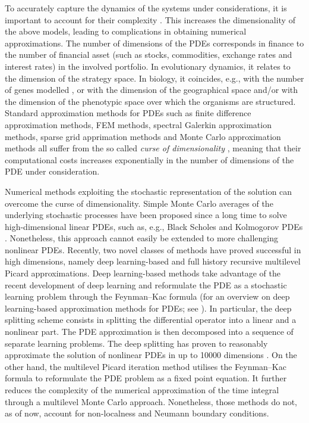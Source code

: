 To accurately capture the dynamics of the systems under considerations, it is important to account for their complexity \cite{Doebeli2010}. This increases the dimensionality of the above models, leading to complications in obtaining numerical approximations.
The number of dimensions of the PDEs corresponds in finance to the number of financial asset (such as stocks, commodities, exchange rates and interest rates) in the involved portfolio. In evolutionary dynamics, it relates to the dimension of the strategy space. In biology, it coincides, e.g., with the number of genes modelled \cite{Pajaro2017}, or with the dimension of the geographical space and/or with the dimension of the phenotypic space over which the organisms are structured.
%
Standard approximation methods for PDEs such as finite difference approximation methods, FEM methods, spectral Galerkin approximation methods, sparse grid apprimation methods and Monte Carlo approximation methods all suffer from the so called \textit{curse of dimensionality} \cite{Bellman}, meaning that their computational costs increases exponentially in the number of dimensions of the PDE under consideration. 

Numerical methods exploiting the stochastic representation of the solution can overcome the curse of dimensionality. Simple Monte Carlo averages of the underlying stochastic processes have been proposed since a long time to solve high-dimensional linear PDEs, such as, e.g., Black Scholes and Kolmogorov PDEs \cite{E2020}. Nonetheless, this approach cannot easily be extended to more challenging nonlinear PDEs.
%
Recently, two novel classes of methods have proved successful in high dimensions, namely deep learning-based and full history recursive multilevel Picard approximations.
%
Deep learning-based methods take advantage of the recent development of deep learning \cite{LeCun2015} and reformulate the PDE as a stochastic learning problem through the Feynman--Kac formula \cite{Beck2017a,Han2018} (for an overview on deep learning-based approximation methods for PDEs; see \cite{Beck2020}). In particular, the deep splitting scheme consists in splitting the differential operator into a linear and a nonlinear part. The PDE approximation is then decomposed into a sequence of separate learning problems. The deep splitting has proven to reasonably approximate the solution of nonlinear PDEs in up to 10000 dimensions \cite{Beck2019}.
%
On the other hand, the multilevel Picard iteration method utilises the Feynman--Kac formula to reformulate the PDE problem as a fixed point equation. It further reduces the complexity of the numerical approximation of the time integral through a multilevel Monte Carlo approach.
%
Nonetheless, those methods do not, as of now, account for non-localness and Neumann boundary conditions.

